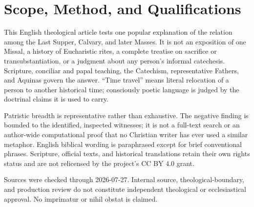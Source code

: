 \section{Scope, Method, and Qualifications}

This English theological article tests one popular explanation of the relation
among the Last Supper, Calvary, and later Masses. It is not an exposition of one
Missal, a history of Eucharistic rites, a complete treatise on sacrifice or
transubstantiation, or a judgment about any person's informal catechesis.
Scripture, conciliar and papal teaching, the Catechism, representative Fathers,
and Aquinas govern the answer. ``Time travel'' means literal relocation of a
person to another historical time; consciously poetic language is judged by
the doctrinal claims it is used to carry.

Patristic breadth is representative rather than exhaustive. The negative
finding is bounded to the identified, inspected witnesses; it is not a
full-text search or an author-wide computational proof that no Christian writer
has ever used a similar metaphor. English biblical wording is paraphrased
except for brief conventional phrases.
Scripture, official texts, and historical translations retain their own rights
status and are not relicensed by the project's CC BY 4.0 grant.

Sources were checked through 2026-07-27. Internal source, theological-boundary,
and production review do not constitute independent theological or
ecclesiastical approval. No imprimatur or nihil obstat is claimed.

